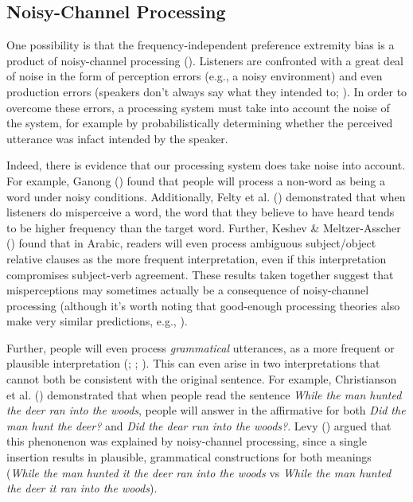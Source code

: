 \documentclass[
  12pt,
  letterpaper,
]{scrreport}
\begin{document}
\subsection{Noisy-Channel Processing}\label{noisy-channel-processing}

One possibility is that the frequency-independent preference extremity
bias is a product of noisy-channel processing
(). Listeners are confronted with a great deal of noise in the
form of perception errors (e.g., a noisy environment) and even
production errors (speakers don't always say what they intended to;
). In order to overcome these errors, a processing system must
take into account the noise of the system, for example by
probabilistically determining whether the perceived utterance was infact
intended by the speaker.

Indeed, there is evidence that our processing system does take noise
into account. For example, Ganong
() found
that people will process a non-word as being a word under noisy
conditions. Additionally, Felty et al.
() demonstrated that
when listeners do misperceive a word, the word that they believe to have
heard tends to be higher frequency than the target word. Further, Keshev
\& Meltzer-Asscher ()
found that in Arabic, readers will even process ambiguous subject/object
relative clauses as the more frequent interpretation, even if this
interpretation compromises subject-verb agreement. These results taken
together suggest that misperceptions may sometimes actually be a
consequence of noisy-channel processing (although it's worth noting that
good-enough processing theories also make very similar predictions,
e.g., ).

Further, people will even process \emph{grammatical} utterances, as a
more frequent or plausible interpretation
(; ;
). This can even arise in two interpretations that cannot
both be consistent with the original sentence. For example, Christianson
et al. ()
demonstrated that when people read the sentence
\emph{While the man hunted the deer ran into the woods}, people will
answer in the affirmative for both \emph{Did the man hunt the deer?} and
\emph{Did the dear run into the woods?}. Levy
() argued that this
phenonenon was explained by noisy-channel processing, since a single
insertion results in plausible, grammatical constructions for both
meanings (\emph{While the man hunted it the deer ran into the woods} vs
\emph{While the man hunted the deer it ran into the woods}).
\end{document}
